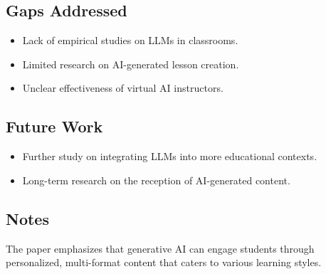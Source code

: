 \subsection{Gaps Addressed}
\begin{itemize}
    \item Lack of empirical studies on LLMs in classrooms.
    \item Limited research on AI-generated lesson creation.
    \item Unclear effectiveness of virtual AI instructors.
\end{itemize}

\subsection{Future Work}
\begin{itemize}
    \item Further study on integrating LLMs into more educational contexts.
    \item Long-term research on the reception of AI-generated content.
\end{itemize}

\subsection{Notes}
The paper emphasizes that generative AI can engage students through personalized, multi-format content that caters to various learning styles.
